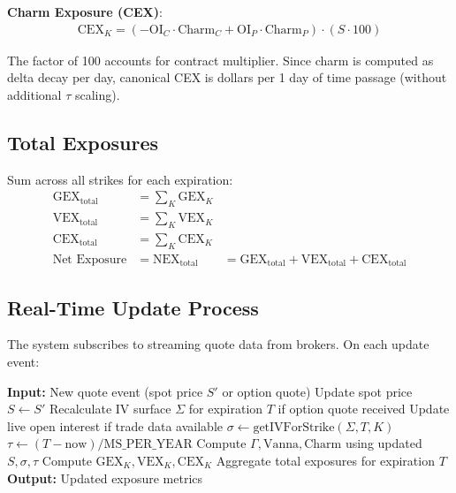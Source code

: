 \documentclass[11pt, a4paper]{article}
\begin{document}
\textbf{Charm Exposure (CEX)}:
\begin{align}
\text{CEX}_K = \left(-\text{OI}_C \cdot \text{Charm}_C + \text{OI}_P \cdot \text{Charm}_P\right) \cdot (S \cdot 100)
\end{align}

The factor of 100 accounts for contract multiplier. Since charm is computed as delta decay per day, canonical CEX is dollars per 1 day of time passage (without additional $\tau$ scaling).

\subsection{Total Exposures}

Sum across all strikes for each expiration:
\begin{align}
\text{GEX}_{\text{total}} &= \sum_K \text{GEX}_K \\
\text{VEX}_{\text{total}} &= \sum_K \text{VEX}_K \\
\text{CEX}_{\text{total}} &= \sum_K \text{CEX}_K \\
\text{Net Exposure} &= \text{NEX}_{\text{total}} &= \text{GEX}_{\text{total}} + \text{VEX}_{\text{total}} + \text{CEX}_{\text{total}}
\end{align}

\subsection{Real-Time Update Process}

The system subscribes to streaming quote data from brokers. On each update event:

\begin{algorithm}
\caption{Real-Time Exposure Update}
\begin{algorithmic}[1]
\State \textbf{Input:} New quote event (spot price $S'$ or option quote)
\State Update spot price $S \leftarrow S'$
\State Recalculate IV surface $\Sigma$ for expiration $T$ if option quote received
\State Update live open interest if trade data available
        \State $\sigma \leftarrow \text{getIVForStrike}(\Sigma, T, K)$
        \State $\tau \leftarrow (T - \text{now}) / \text{MS\_PER\_YEAR}$
        \State Compute $\Gamma, \text{Vanna}, \text{Charm}$ using updated $S, \sigma, \tau$
        \State Compute $\text{GEX}_K, \text{VEX}_K, \text{CEX}_K$
    \EndFor
    \State Aggregate total exposures for expiration $T$
\EndFor
\State \textbf{Output:} Updated exposure metrics
\end{algorithmic}
\end{algorithm}
\end{document}
